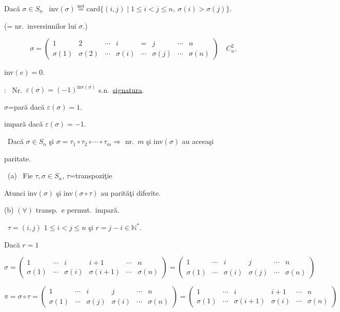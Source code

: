 \bigskip
\noindent Dacă $\sigma\in S_n$ \ inv$(\sigma) \overset{\text{not}}{=} \text{card}\{(i,j) \mid 1\leq i<j\leq n,\ \sigma(i)>\sigma(j)\}.$

\noindent (= nr.\ inversiunilor lui $\sigma$.)

\[
\sigma = \begin{pmatrix}1&2&\cdots&i&=&j&\cdots&n\\ \sigma(1)&\sigma(2)&\cdots&\sigma(i)&\cdots&\sigma(j)&\cdots&\sigma(n)\end{pmatrix} \quad C_n^2.
\]

\noindent inv$(e)=0$.

\bigskip
\noindent{}: \ Nr.\ $\varepsilon(\sigma) = (-1)^{\text{inv}(\sigma)}$ s.n.\ \underline{signatura}.

\bigskip
\noindent $\sigma$=pară dacă $\varepsilon(\sigma)=1$.

\noindent \phantom{$\sigma$=}impară dacă $\varepsilon(\sigma)=-1$.

\bigskip
\noindent{} \ Dacă $\sigma\in S_n$ şi $\sigma=\tau_1\circ\tau_2\circ\cdots\circ\tau_m \Rightarrow$ nr.\ $m$ şi inv$(\sigma)$ au aceeaşi

\noindent paritate.

\bigskip
\noindent{} \ (a) \ Fie $\tau,\sigma\in S_n$, $\tau$=transpoziţie

\noindent Atunci inv$(\sigma)$ şi inv$(\sigma\circ\tau)$ au parităţi diferite.

\noindent (b) $(\forall)$ transp.\ e permut.\ impară.

\bigskip
\noindent{} \ $\tau=(i,j)$ \quad $1\leq i<j\leq n$ şi $r=j-i\in\mathbb{N}^*$.

\bigskip
\noindent Dacă $r=1$

\[
\sigma = \begin{pmatrix}1&\cdots&i&i+1&\cdots&n\\ \sigma(1)&\cdots&\sigma(i)&\sigma(i+1)&\cdots&\sigma(n)\end{pmatrix}
= \begin{pmatrix}1&\cdots&i&j&\cdots&n\\ \sigma(1)&\cdots&\sigma(i)&\sigma(j)&\cdots&\sigma(n)\end{pmatrix}
\]

\[
\pi=\sigma\circ\tau = \begin{pmatrix}1&\cdots&i&j&\cdots&n\\ \sigma(1)&\cdots&\sigma(j)&\sigma(i)&\cdots&\sigma(n)\end{pmatrix}
= \begin{pmatrix}1&\cdots&i&i+1&\cdots&n\\ \sigma(1)&\cdots&\sigma(i+1)&\sigma(i)&\cdots&\sigma(n)\end{pmatrix}
\]

